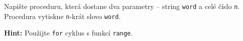 \question[50]
Napište proceduru, která dostane dva parametry -- string \texttt{word} a celé
číslo \texttt{n}. Procedura vytiskne \texttt{n}-krát slovo \texttt{word}.

\textbf{Hint:} Použijte \texttt{for} cyklus s funkcí \texttt{range}.